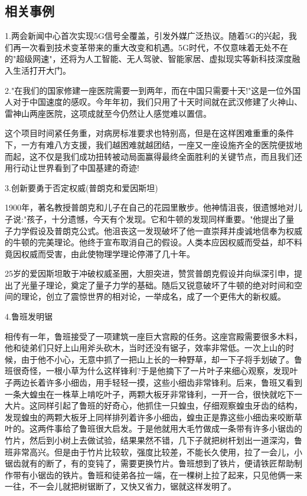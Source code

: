 \documentclass[UTF8]{ctexart}
\begin{document}
\subsection{相关事例}
1.两会新闻中心首次实现5G信号全覆盖，引发外媒广泛热议。随着5G的兴起，我们再一次看到技术变革带来的重大改变和机遇。5G时代，不仅意味着无处不在的"超级网速"，还将为人工智能、无人驾驶、智能家居、虚拟现实等新科技深度融入生活打开大门。\par
2."在我们的国家修建一座医院需要一到两年，而在中国只需要十天!"这是一位外国人对于中国速度的感叹。今年年初，我们只用了十天时间就在武汉修建了火神山、雷神山两座医院，这项成就至今仍然让人感觉难以置信。\par
这个项目时间紧任务重，对病房标准要求也特别高，但是在这样困难重重的条件下，一方有难八方支援，我们越困难就越团结，一座又一座设施齐全的医院便拔地而起，这不仅是我们成功扭转被动局面赢得最终全面胜利的关键节点，而且我们还用行动让世界看到了中国基建的奇迹!\par
3.创新要勇于否定权威(普朗克和爱因斯坦)\par
1900年，著名教授普朗克和儿子在自己的花园里散步。他神情沮丧，很遗憾地对儿子说:"孩子，十分遗憾，今天有个发现。它和牛顿的发现同样重要。"他提出了量子力学假设及普朗克公式。他沮丧这一发现破坏了他一直崇拜并虔诚地信奉为权威的牛顿的完美理论。他终于宣布取消自己的假设。人类本应因权威而受益，却不料竟因权威而受害，由此使物理学理论停滞了几十年。\par
25岁的爱因斯坦敢于冲破权威圣圈，大胆突进，赞赏普朗克假设并向纵深引申，提出了光量子理论，奠定了量子力学的基础。随后又锐意破坏了牛顿的绝对时间和空间的理论，创立了震惊世界的相对论，一举成名，成了一个更伟大的新权威。\par
4.鲁班发明锯\par
相传有一年，鲁班接受了一项建筑一座巨大宫殿的任务。这座宫殿需要很多木料，他和徒弟们只好上山用斧头砍木，当时还没有锯子，效率非常低。一次上山的时候，由于他不小心，无意中抓了一把山上长的一种野草，却一下子将手划破了。鲁班很奇怪，一根小草为什么这样锋利?于是他摘下了一片叶子来细心观察，发现叶子两边长着许多小细齿，用手轻轻一摸，这些小细齿非常锋利。后来，鲁班又看到一条大蝗虫在一株草上啃吃叶子，两颗大板牙非常锋利，一开一合，很快就吃下一大片。这同样引起了鲁班的好奇心，他抓住一只蝗虫，仔细观察蝗虫牙齿的结构，发现蝗虫的两颗大板牙上同样排列着许多小细齿，蝗虫正是靠这些小细齿来咬断草叶的。这两件事给了鲁班很大启发。于是他就用大毛竹做成一条带有许多小锯齿的竹片，然后到小树上去做试验，结果果然不错，几下子就把树杆划出一道深沟，鲁班非常高兴。但是由于竹片比较软，强度比较差，不能长久使用，拉了一会儿，小锯齿就有的断了，有的变钝了，需要更换竹片。鲁班想到了铁片，便请铁匠帮助制作带有小锯齿的铁片。鲁班和徒弟各拉一端，在一棵树上拉了起来，只见他俩一来一往，不一会儿就把树锯断了，又快又省力，锯就这样发明了。\par
\end{document}
